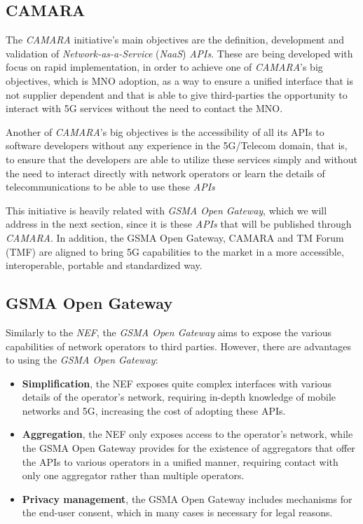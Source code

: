 \subsection{CAMARA}\label{sec:camara}

The \emph{CAMARA} initiative's main objectives are the definition, development
and validation of \emph{Network-as-a-Service} (\emph{NaaS}) \emph{APIs}. These
are being developed with focus on rapid implementation, in order to achieve one
of \emph{CAMARA}'s big objectives, which is MNO adoption, as a way to ensure a
unified interface that is not supplier dependent \cite{5gamericas} and that is
able to give third-parties the opportunity to interact with 5G services without
the need to contact the MNO.

Another of \emph{CAMARA}'s big objectives is the accessibility of
all its APIs to software developers without any experience in the
5G/Telecom domain, that is, to ensure that the developers are
able to utilize these services simply and without the need to
interact directly with network operators or learn the details of
telecommunications to be able to use these \emph{APIs}

This initiative is heavily related with \emph{GSMA Open Gateway}, which we will
address in the next section, since it is these \emph{APIs} that will be
published through \emph{CAMARA}. In addition, the GSMA Open Gateway, CAMARA and
TM Forum (TMF) are aligned to bring 5G capabilities to the market in a more
accessible, interoperable, portable and standardized way.


\subsection{GSMA Open Gateway}

Similarly to the \emph{NEF}, the \emph{GSMA Open Gateway} aims to
expose the various capabilities of network operators to third
parties. However, there are advantages to using the \emph{GSMA
	Open Gateway}:

\begin{itemize}
	\item \textbf{Simplification}, the NEF exposes quite complex interfaces with
	      various details of the operator's network, requiring in-depth knowledge of
	      mobile networks and 5G, increasing the cost of adopting these APIs.

	\item \textbf{Aggregation}, the NEF only exposes access to
	      the operator's network, while the GSMA Open Gateway
	      provides for the existence of aggregators that offer the
	      APIs to various operators in a unified manner, requiring
	      contact with only one aggregator rather than multiple
	      operators.

	\item \textbf{Privacy management}, the GSMA Open Gateway includes
	      mechanisms for the end-user consent, which in many cases is
	      necessary for legal reasons.\end{itemize}

